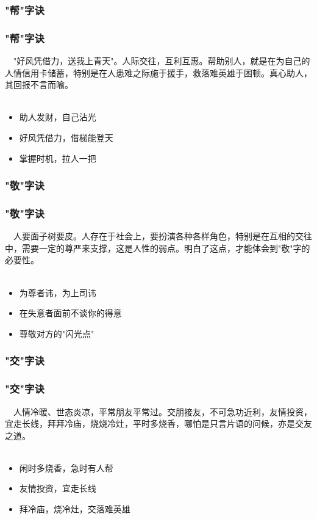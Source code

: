 \subsubsection{"帮"字诀}
\begin{frame}
\frametitle{"帮"字诀}
\noindent\handr~~"好风凭借力，送我上青天"。人际交往，互利互惠。帮助别人，就是在为自己的人情信用卡储蓄，特别是在人患难之际施于援手，救落难英雄于困顿。真心助人，其回报不言而喻。
~\\
~\\
\begin{itemize}
    \item 助人发财，自己沾光
    \item 好风凭借力，借梯能登天
    \item 掌握时机，拉人一把
\end{itemize}
\end{frame}

\subsubsection{"敬"字诀}
\begin{frame}
\frametitle{"敬"字诀}
\noindent\handr~~人要面子树要皮。人存在于社会上，要扮演各种各样角色，特别是在互相的交往中，需要一定的尊严来支撑，这是人性的弱点。明白了这点，才能体会到"敬"字的必要性。
~\\
~\\
\begin{itemize}
    \item 为尊者讳，为上司讳
    \item 在失意者面前不谈你的得意
    \item 尊敬对方的"闪光点"
\end{itemize}
\end{frame}

\subsubsection{"交"字诀}
\begin{frame}
\frametitle{"交"字诀}
\noindent\handr~~人情冷暖、世态炎凉，平常朋友平常过。交朋接友，不可急功近利，友情投资，宜走长线，拜拜冷庙，烧烧冷灶，平时多烧香，哪怕是只言片语的问候，亦是交友之道。
~\\
~\\
\begin{itemize}
    \item 闲时多烧香，急时有人帮
    \item 友情投资，宜走长线
    \item 拜冷庙，烧冷灶，交落难英雄
\end{itemize}
\end{frame}

